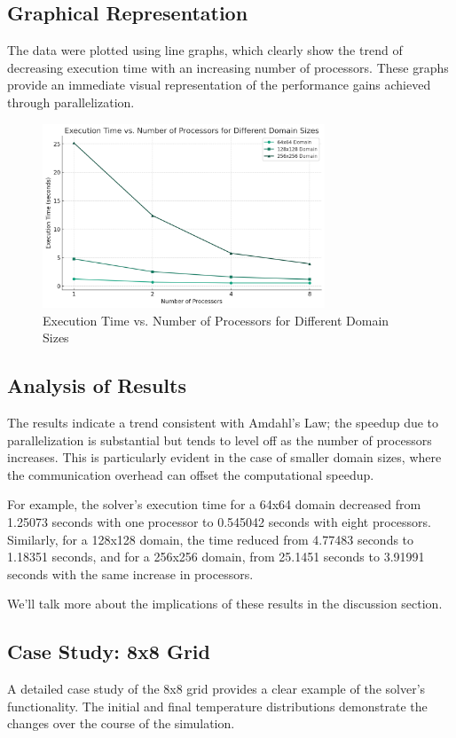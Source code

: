 \documentclass[11pt]{article}
\begin{document}
        \subsection{Graphical Representation}
        The data were plotted using line graphs, which clearly show the trend of decreasing execution time with an increasing number of processors. These graphs provide an immediate visual representation of the performance gains achieved through parallelization.

    \begin{figure}[ht]
        \centering
        \includegraphics[width=0.75\textwidth]{img/performance.png}
        \caption{Execution Time vs. Number of Processors for Different Domain Sizes}\label{fig:execution_time}
    \end{figure}

        \subsection{Analysis of Results}
        The results indicate a trend consistent with Amdahl's Law; the speedup due to parallelization is substantial but tends to level off as the number of processors increases. This is particularly evident in the case of smaller domain sizes, where the communication overhead can offset the computational speedup.

        For example, the solver's execution time for a 64x64 domain decreased from 1.25073 seconds with one processor to 0.545042 seconds with eight processors. Similarly, for a 128x128 domain, the time reduced from 4.77483 seconds to 1.18351 seconds, and for a 256x256 domain, from 25.1451 seconds to 3.91991 seconds with the same increase in processors.

        We'll talk more about the implications of these results in the discussion section.

        \subsection{Case Study: 8x8 Grid}
        A detailed case study of the 8x8 grid provides a clear example of the solver's functionality. The initial and final temperature distributions demonstrate the changes over the course of the simulation.
\end{document}
